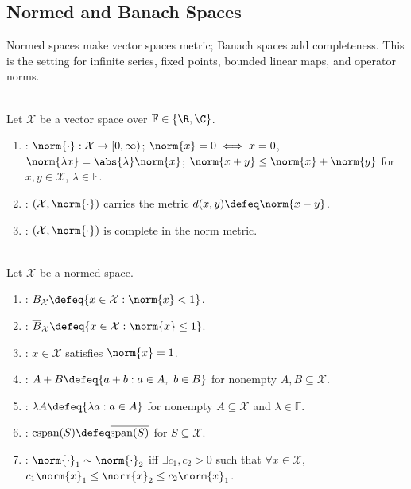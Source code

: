 \subsection{Normed and Banach Spaces}

%

Normed spaces make vector spaces metric; Banach spaces add completeness. This is the setting for infinite series, fixed points, bounded linear maps, and operator norms.

\begin{definition} \label{def:normed-and-banach-spaces} \\
Let $\mathcal{X}$ be a vector space over $\mathbb{F}\in\{\R,\C\}$.
\begin{enumerate}[label=(\roman*)]
\setlength{\itemsep}{0pt}
\item {}: $\norm{\cdot}:\mathcal{X}\to[0,\infty)$; $\norm{x}=0\iff x=0$, $\norm{\lambda x}=\abs{\lambda}\norm{x}$; $\norm{x+y}\leq\norm{x}+\norm{y}$ for $x,y\in\mathcal{X}$, $\lambda\in\mathbb{F}$.
\item {}: $(\mathcal{X},\norm{\cdot})$ carries the metric $d(x,y)\defeq\norm{x-y}$.
\item {}: $(\mathcal{X},\norm{\cdot})$ is complete in the norm metric.
\end{enumerate}
\end{definition}

\begin{definition} \label{def:basic-normed-space-geometry} \\
Let $\mathcal{X}$ be a normed space.
\begin{enumerate}[label=(\roman*)]
\setlength{\itemsep}{0pt}
\item {}: $B_{\mathcal{X}}\defeq\{x\in\mathcal{X}:\norm{x}<1\}$.
\item {}: $\overline{B}_{\mathcal{X}}\defeq\{x\in\mathcal{X}:\norm{x}\leq1\}$.
\item {}: $x\in\mathcal{X}$ satisfies $\norm{x}=1$.
\item {}: $A+B\defeq\{a+b:a\in A,\ b\in B\}$ for nonempty $A,B\subseteq\mathcal{X}$.
\item {}: $\lambda A\defeq\{\lambda a:a\in A\}$ for nonempty $A\subseteq\mathcal{X}$ and $\lambda\in\mathbb{F}$.
\item {}: $\operatorname{cspan}(S)\defeq\overline{\operatorname{span}(S)}$ for $S\subseteq\mathcal{X}$.
\item {}: $\norm{\cdot}_1\sim\norm{\cdot}_2$ iff $\exists c_1,c_2>0$ such that $\forall x\in\mathcal{X}$, $c_1\norm{x}_1\leq\norm{x}_2\leq c_2\norm{x}_1$.
\end{enumerate}
\end{definition}

